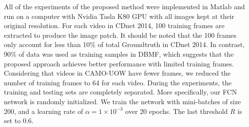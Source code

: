 \documentclass[journal]{IEEEtran}
\begin{document}
All of the experiments of the proposed method were implemented in Matlab and run on a computer with Nvidia Tasla K80 GPU with all images kept at their original resolution. 
For each video in CDnet 2014, 100 training frames are extracted to produce the image patch. 
It should be noted that the 100 frames only account for less than 10\% of total Groundtruth in CDnet 2014. 
In contrast, 90\% of data was used as training samples in DBMF, which suggests that the proposed approach achieves better performance with limited training frames. 
Considering that videos in CAMO-UOW have fewer frames, we reduced the number of training frames to 64 for each video. 
During the experiments, the training and testing sets are completely separated. 
More specifically, our FCN network is randomly initialized. 
We train the network with mini-batches of size 200, and a learning rate of $\alpha  = 1 \times 10^{{−3}}$ over 20 epochs. 
The last threshold $R$ is set to 0.6.


\end{document}

